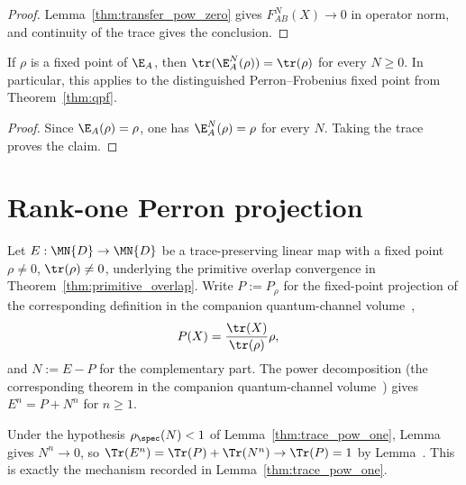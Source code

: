 \begin{proof}\leanok
    Lemma~\ref{thm:transfer_pow_zero} gives $F_{AB}^N(X)\to0$ in operator
    norm, and continuity of the trace gives the conclusion.
\end{proof}

\begin{lemma}\label{thm:self_persist}
    \leanok
    If $\rho$ is a fixed point of $\E_A$, then
    $\tr(\E_A^N(\rho))=\tr(\rho)$ for every $N\geq0$. In particular, this
    applies to the distinguished Perron--Frobenius fixed point from
    Theorem~\ref{thm:qpf}.
\end{lemma}

\begin{proof}\leanok
    Since $\E_A(\rho)=\rho$, one has $\E_A^N(\rho)=\rho$ for every $N$.
    Taking the trace proves the claim.
\end{proof}

\section{Rank-one Perron projection}
\label{sec:app_spectral_perron_projection}

Let $E:\MN{D}\to\MN{D}$ be a trace-preserving linear map with a fixed point
$\rho\neq0$, $\tr(\rho)\neq0$, underlying the primitive overlap convergence in
Theorem~\ref{thm:primitive_overlap}. Write
$P:=P_\rho$ for the fixed-point projection of
the corresponding definition in the companion quantum-channel volume~\cite[``Fixed-point projection'']{QICLean2026Blueprint},
\begin{align}
    P(X)
     & =\frac{\tr(X)}{\tr(\rho)}\rho,
    \notag
\end{align}
and $N:=E-P$ for the complementary part. The power decomposition
(the corresponding theorem in the companion quantum-channel volume~\cite[``Power decomposition'']{QICLean2026Blueprint}) gives
$E^n=P+N^n$ for $n\geq1$.


Under the hypothesis $\rho_{\spec}(N)<1$ of Lemma~\ref{thm:trace_pow_one},
Lemma~\cite[``Powers vanish below unit spectral radius'']{QICLean2026Blueprint} gives $N^n\to0$, so
$\Tr(E^n)=\Tr(P)+\Tr(N^n)\to\Tr(P)=1$ by
Lemma~\cite[``Trace of the fixed-point projection'']{QICLean2026Blueprint}. This is exactly the mechanism recorded
in Lemma~\ref{thm:trace_pow_one}.

